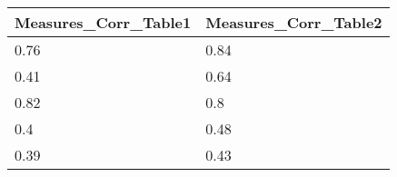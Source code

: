 \begin{tabular}{ll}
Measures_Corr_Table1 & Measures_Corr_Table2 \\ 
\hline 
0.76 & 0.84 \\ 
0.41 & 0.64 \\ 
0.82 & 0.8 \\ 
0.4 & 0.48 \\ 
0.39 & 0.43 \\ 
\hline 
\end{tabular}